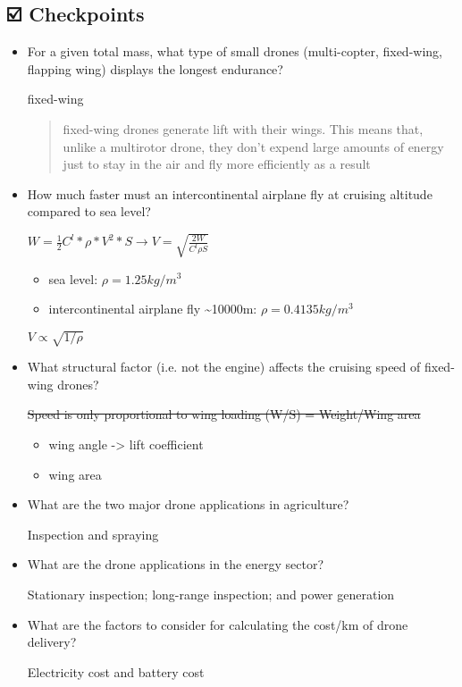 \documentclass[]{article}
\begin{document}
\subsection{☑️ Checkpoints}\label{header-n118}

\begin{itemize}
\item
  For a given total mass, what type of small drones (multi-copter,
  fixed-wing, flapping wing) displays the longest endurance?

  fixed-wing

  \begin{quote}
  fixed-wing drones generate lift with their wings. This means that,
  unlike a multirotor drone, they don't expend large amounts of energy
  just to stay in the air and fly more efficiently as a result
  \end{quote}
\item
  How much faster must an intercontinental airplane fly at cruising
  altitude compared to sea level?

  \(W=\frac{1}{2} C^{l} * \rho {*} V^{2} * S \rightarrow V = \sqrt{\frac{2W}{C^l \rho S}}\)

  \begin{itemize}
  \item
    sea level: \(\rho = 1.25kg/m^3\)
  \item
    intercontinental airplane fly \textasciitilde{}10000m:
    \(\rho = 0.4135kg/m^3\)
  \end{itemize}

  \(V \propto \sqrt{1/\rho}\)
\item
  What structural factor (i.e. not the engine) affects the cruising
  speed of fixed-wing drones?

  \sout{Speed is only proportional to wing loading (W/S) = Weight/Wing
  area}

  \begin{itemize}
  \item
    wing angle -\textgreater{} lift coefficient
  \item
    wing area
  \end{itemize}
\item
  What are the two major drone applications in agriculture?

  Inspection and spraying
\item
  What are the drone applications in the energy sector?

  Stationary inspection; long-range inspection; and power generation
\item
  What are the factors to consider for calculating the cost/km of drone
  delivery?

  Electricity cost and battery cost
\end{itemize}
\end{document}
